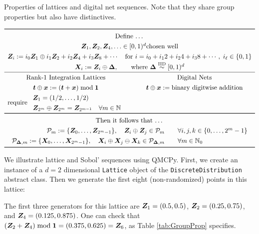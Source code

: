 \documentclass[graybox,footinfo]{svmult}
\newcommand{\IID}{\textup{IID}}
\newcommand{\IIDsim}{\overset{\IID}{\sim}}
\begin{document}
\begin{table}
	\centering
	\caption{Properties of lattices and digital net sequences.  Note that they share group properties but also have distinctives.} \label{tab:GroupProp}
\[
	\renewcommand{\arraystretch}{1.3}
\begin{array}{c@{\qquad}c}
	\toprule
	\multicolumn{2}{c}{\text{Define \ldots}} \\
	\multicolumn{2}{c}{\bsZ_1, \bsZ_2, \bsZ_4, \ldots \in [0,1)^d \text{chosen well} } \\
	\multicolumn{2}{c}{
	\bsZ_{i} := i_0  \bsZ_1 \oplus i_1 \bsZ_{2} + i_2  \bsZ_{4} +  i_3  \bsZ_{8} + \cdots 
	\quad
	\text{for }i = i_0 +i_1 2 + i_2 4 + i_3 8 + \cdots, \; i_\ell \in \{0,1\}} \\
    \multicolumn{2}{c}{\bsX_i := \bsZ_i \oplus \bsDelta, \qquad \text{where }\bsDelta \IIDsim [0,1)^d} \\  \hline
	\text{Rank-1 Integration Lattices} & \text{Digital Nets} \\
		\bst \oplus \bsx : = (\bst + \bsx) \bmod \bsone & \bst \oplus \bsx := \text{binary digitwise addition} \\ 
		 \text{require } \begin{array}{l} \bsZ_1 = (1/2, \ldots, 1/2) \\
		 	\bsZ_{2^{m}} \oplus \bsZ_{2^{m}} = \bsZ_{2^{m-1}} \quad \forall m \in \bbN \end{array}
		\\
\toprule
\multicolumn{2}{c}{\text{Then it follows that \ldots}} \\
	\multicolumn{2}{c}{\begin{array}{r}
			\calP_m := \{\bsZ_0, \ldots, \bsZ_{2^m-1}\}, \quad
			\bsZ_i \oplus \bsZ_j \in \calP_m \\
			\calP_{\bsDelta,m} := \{\bsX_0, \ldots, \bsX_{2^m-1}\}, \quad
			\bsX_i \oplus \bsX_j \ominus \bsX_k \in \calP_{\bsDelta,m}
	\end{array} \quad \begin{array}{l}\forall  i,j,k \in \{0, \ldots, 2^{m} -1\} \\ \forall m \in \bbN_0\end{array}} \\
\bottomrule
\end{array}
\]
\end{table}

We illustrate lattice and Sobol' sequences using QMCPy. First, we create an instance of a $d=2$ dimensional \texttt{Lattice} object of the  \texttt{DiscreteDistribution} abstract class.  Then we generate the first eight (non-randomized) points in this lattice:

The first three generators for this lattice are ${\boldsymbol{Z}}_1 = (0.5, 0.5)$, ${\boldsymbol{Z}}_2 = (0.25, 0.75)$, and ${\boldsymbol{Z}}_4 = (0.125, 0.875)$.  One can check that $({\boldsymbol{Z}}_2 + {\boldsymbol{Z}}_4) \bmod {\boldsymbol{1}} = (0.375, 0.625) = {\boldsymbol{Z}}_6$, as Table \ref{tab:GroupProp} specifies.
\end{document}
